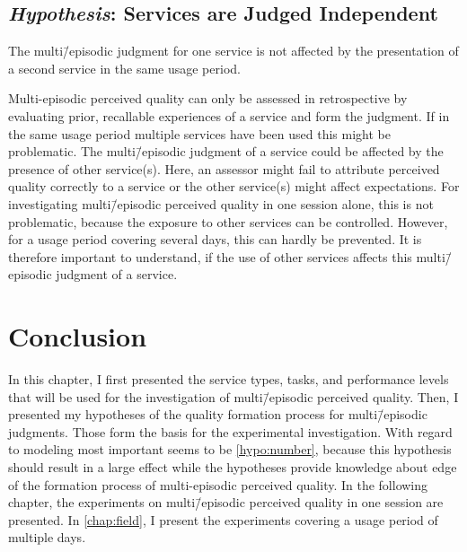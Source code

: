\subsection[H7: Services are Judged Independent]{\emph{Hypothesis}: Services are Judged Independent}
\begin{hypothesis}\label{hypo:independent}
The multi\=/episodic judgment for one service is not affected by the presentation of a second service in the same usage period.
\end{hypothesis}

Multi-episodic perceived quality can only be assessed in retrospective by evaluating prior, recallable experiences of a service and form the judgment.
If in the same usage period multiple services have been used this might be problematic.
The multi\=/episodic judgment of a service could be affected by the presence of other service(s).
Here, an assessor might fail to attribute perceived quality correctly to a service or the other service(s) might affect expectations.
For investigating multi\=/episodic perceived quality in one session alone, this is not problematic, because the exposure to other services can be controlled.
However, for a usage period covering several days, this can hardly be prevented.
It is therefore important to understand, if the use of other services affects this multi\=/episodic judgment of a service.

\section{Conclusion}
In this chapter, I first presented the service types, tasks, and performance levels that will be used for the investigation of multi\=/episodic perceived quality.
Then, I presented my hypotheses of the quality formation process for multi\=/episodic judgments.
Those form the basis for the experimental investigation.
With regard to modeling most important seems to be \autoref{hypo:number}, because this hypothesis should result in a large effect while the hypotheses provide knowledge about edge of the formation process of multi-episodic perceived quality.
In the following chapter, the experiments on multi\=/episodic perceived quality in one session are presented.
In \autoref{chap:field}, I present the experiments covering a usage period of multiple days. 
